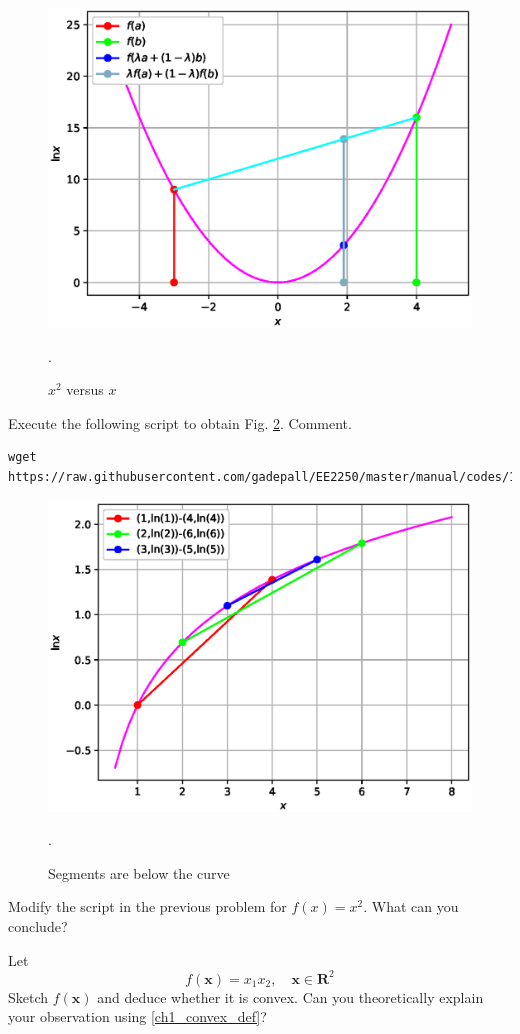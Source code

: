 \documentclass[journal,12pt,twocolumn]{IEEEtran}
\begin{document}
\begin{figure}[!ht]
\centering
\includegraphics[width=\columnwidth]{./figs/1.2.eps}
\caption{ $x^2$ versus $x$}.
\label{fig.1.2}	
\end{figure}
%
\begin{problem}
Execute the following script to obtain Fig. \ref{fig.1.3}. Comment.
\end{problem}
%
\begin{lstlisting}
wget https://raw.githubusercontent.com/gadepall/EE2250/master/manual/codes/1.3.py
\end{lstlisting}

%
\begin{figure}[!ht]
\centering
\includegraphics[width=\columnwidth]{./figs/1.3.eps}
\caption{ Segments are below the curve}.
\label{fig.1.3}	
\end{figure}
%
\begin{problem}
Modify the script in the previous problem for $f(x) = x^2$.  What can you conclude?
\end{problem}
\begin{problem}
Let 
\begin{equation}
f(\mathbf{x}) = x_1x_2, \quad \mathbf{x} \in \mathbf{R}^2
\end{equation}
Sketch $f(\mathbf{x})$ and deduce whether it is convex.
Can you theoretically explain your observation using \eqref{ch1_convex_def}?
\end{problem}
%
\end{document}

